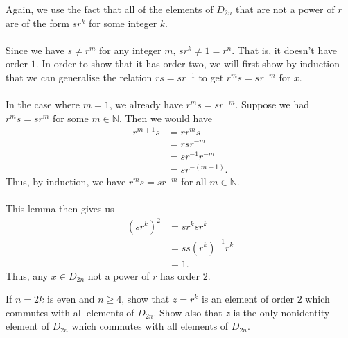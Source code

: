 \documentclass[12 pt, letterpaper]{hmcpset}
\begin{document}
\begin{solution}
	Again, we use the fact that all of the elements of $D_{2n}$ that are not a power of $r$ are of the form $s r^k$ for some integer $k$.\\\\ 
	Since we have $s \neq r^m$ for any integer $m$, $s r^k \neq 1 = r^n$. That is, it doesn't have order $1$. In order to show that it has order two, we will first show by induction that we can generalise the relation $r s = s r^{-1}$ to get $r^m s = s r^{-m}$ for $x$. \\\\
	In the case where $m = 1$, we already have $r^m s = s r^{-m}$. Suppose we had $r^m s = s r^m$ for some $m \in \mathbb N$. Then we would have
	\[
		\begin{split}
			r^{m + 1} s & = r r^m s \\
				    & = r s r^{-m} \\
				    & = s r^{-1} r^{-m} \\
				    & = s r^{-(m + 1)}.
		\end{split}
	\]
	Thus, by induction, we have $r^m s = s r^{-m}$ for all $m \in \mathbb N$. \\\\
	This lemma then gives us
	\[
		\begin{split}
			(s r^k)^2 & = s r^k s r^k \\
				  & = s s (r^k)^{-1} r^k \\
				  & = 1.
		\end{split}
	\]
	Thus, any $x \in D_{2n}$ not a power of $r$ has order $2$.
\end{solution}

\pagebreak

\begin{problem}
	If $n = 2k$ is even and $n \ge 4$, show that $z = r^k$ is an element of order $2$ which commutes with all elements of $D_{2n}$. Show also that $z$ is the only nonidentity element of $D_{2n}$ which commutes with all elements of $D_{2n}$.
\end{problem}
\end{document}
